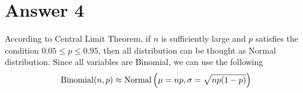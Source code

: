 \section*{Answer 4}











According to Central Limit Theorem, if $n$ is sufficiently large and $p$ satisfies the condition $0.05 \leq p \leq 0.95$, then all distribution can be thought as Normal distribution. Since all variables are Binomial, we can use the following
\begin{equation*}
  \textnormal{Binomial}(n, p) \approx \textnormal{Normal}\left( \mu = np, \sigma = \sqrt{np(1-p)} \right)
\end{equation*}

